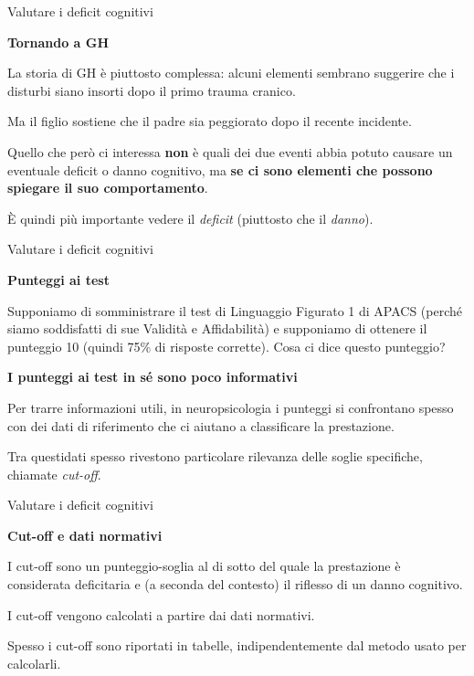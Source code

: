 \documentclass[
  ignorenonframetext,
]{beamer}
\begin{document}
\begin{frame}{Valutare i deficit cognitivi}
\label{valutare-i-deficit-cognitivi-3}
\begin{center}
  \textbf{Tornando a GH}
\end{center}

La storia di GH è piuttosto complessa: alcuni elementi sembrano
suggerire che i disturbi siano insorti dopo il primo trauma cranico.

Ma il figlio sostiene che il padre sia peggiorato dopo il recente
incidente.

Quello che però ci interessa \textbf{non} è quali dei due eventi abbia
potuto causare un eventuale deficit o danno cognitivo, ma \textbf{se ci
sono elementi che possono spiegare il suo comportamento}.

È quindi più importante vedere il \emph{deficit} (piuttosto che il
\emph{danno}).
\end{frame}

\begin{frame}{Valutare i deficit cognitivi}
\label{valutare-i-deficit-cognitivi-4}
\begin{center}
  \textbf{Punteggi ai test}
\end{center}

Supponiamo di somministrare il test di Linguaggio Figurato 1 di APACS
(perché siamo soddisfatti di sue Validità e Affidabilità) e supponiamo
di ottenere il punteggio 10 (quindi 75\% di risposte corrette). Cosa ci
dice questo punteggio?

\begin{center}
  \textbf{I punteggi ai test in sé sono poco informativi}
\end{center}

Per trarre informazioni utili, in neuropsicologia i punteggi si
confrontano spesso con dei dati di riferimento che ci aiutano a
classificare la prestazione.

Tra questidati spesso rivestono particolare rilevanza delle soglie
specifiche, chiamate \emph{cut-off}.
\end{frame}

\begin{frame}{Valutare i deficit cognitivi}
\label{valutare-i-deficit-cognitivi-5}
\begin{center}
  \textbf{Cut-off e dati normativi}
\end{center}

I cut-off sono un punteggio-soglia al di sotto del quale la prestazione
è considerata deficitaria e (a seconda del contesto) il riflesso di un
danno cognitivo.

I cut-off vengono calcolati a partire dai dati normativi.

Spesso i cut-off sono riportati in tabelle, indipendentemente dal metodo
usato per calcolarli.
\end{frame}
\end{document}
